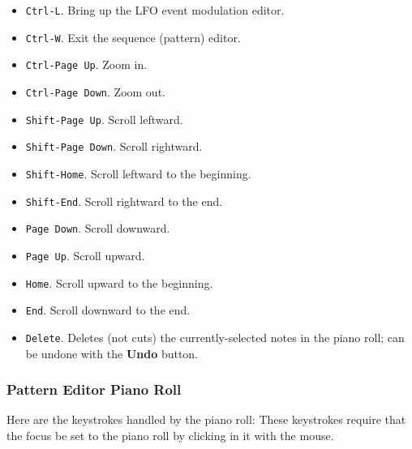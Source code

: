    \begin{itemize}
      \item \texttt{Ctrl-L}.  Bring up the LFO event modulation editor.
      \item \texttt{Ctrl-W}.  Exit the sequence (pattern) editor.
      \item \texttt{Ctrl-Page Up}.  Zoom in.
      \item \texttt{Ctrl-Page Down}.  Zoom out.
      \item \texttt{Shift-Page Up}.  Scroll leftward.
      \item \texttt{Shift-Page Down}.  Scroll rightward.
      \item \texttt{Shift-Home}.  Scroll leftward to the beginning.
      \item \texttt{Shift-End}.  Scroll rightward to the end.
      \item \texttt{Page Down}.  Scroll downward.
      \item \texttt{Page Up}.  Scroll upward.
      \item \texttt{Home}.  Scroll upward to the beginning.
      \item \texttt{End}.  Scroll downward to the end.
      \item \texttt{Delete}.  Deletes (not cuts) the currently-selected notes
         in the piano roll; can be undone with the \textbf{Undo} button.
   \end{itemize}

\subsubsection{Pattern Editor Piano Roll}
\label{subsubsec:kbd_mouse_pattern_editor_piano_roll}

   Here are the keystrokes handled by the piano roll:
   These keystrokes require that the focus be set to the piano roll by clicking
   in it with the mouse.


